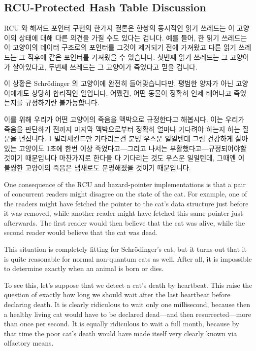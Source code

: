 \subsection{RCU-Protected Hash Table Discussion}
\label{sec:datastruct:RCU-Protected Hash Table Discussion}

RCU 와 해저드 포인터 구현의 한가지 결론은 한쌍의 동시적인 읽기 쓰레드는 이
고양이의 상태에 대해 다른 의견을 가질 수도 있다는 겁니다.
예를 들어, 한 읽기 쓰레드는 이 고양이의 데이터 구조로의 포인터를 그것이
제거되기 전에 가져왔고 다른 읽기 쓰레드는 그 직후에 같은 포인터를 가져왔을 수
있습니다.
첫번째 읽기 쓰레드는 그 고양이가 살아있다고, 두번째 쓰레드는 그 고양이가
죽었다고 믿을 겁니다.

이 상황은 Schr\"odinger 의 고양이에 완전히 들어맞습니다만, 평범한 양자가 아닌
고양이에게도 상당히 합리적인 일입니다.
어쨌건, 어떤 동물이 정확히 언제 태어나고 죽었는지를 규정하기란 불가능합니다.

이를 위해 우리가 어떤 고양이의 죽음을 맥박으로 규정한다고 해봅시다.
이는 우리가 죽음을 판단하기 전까지 마지막 맥박으로부터 정확히 얼마나 기다려야
하는지 하는 질문을 던집니다.
1 밀리세컨드만 기다리는건 분명 우스운 일일텐데 그럼 건강하게 살아있는 고양이도
1초에 한번 이상 죽었다고---그리고 나서는 부활했다고---규정되어야할 것이기
때문입니다
마찬가지로 한다을 다 기다리는 것도 우스운 일일텐데, 그때엔 이 불쌍한 고양이의
죽음은 냄새로도 분명해졌을 것이기 때문입니다.

\iffalse

One consequence of the RCU and hazard-pointer implementations is
that a pair of concurrent readers might disagree on the state of
the cat.
For example, one of the readers might have fetched the pointer to
the cat's data structure just before it was removed, while another
reader might have fetched this same pointer just afterwards.
The first reader would then believe that the cat was alive, while
the second reader would believe that the cat was dead.

This situation is completely fitting for Schr\"odinger's
cat, but it turns out that it is quite reasonable for normal
non-quantum cats as well.
After all, it is impossible to determine exactly when an animal is born
or dies.

To see this, let's suppose that we detect a cat's death by heartbeat.
This raise the question of exactly how long we should wait after the
last heartbeat before declaring death.
It is clearly ridiculous to wait only one millisecond, because then
a healthy living cat would have to be declared dead---and then
resurrected---more than once per second.
It is equally ridiculous to wait a full month, because by that time
the poor cat's death would have made itself very clearly known
via olfactory means.

